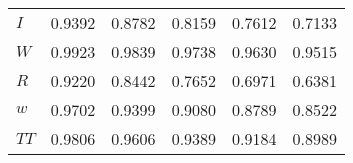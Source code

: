 \begin{center}
\begin{longtable}{lccccc}
$I         $	 & 	    0.9392	 & 	    0.8782	 & 	    0.8159	 & 	    0.7612	 & 	    0.7133 \\ 
$W         $	 & 	    0.9923	 & 	    0.9839	 & 	    0.9738	 & 	    0.9630	 & 	    0.9515 \\ 
$R         $	 & 	    0.9220	 & 	    0.8442	 & 	    0.7652	 & 	    0.6971	 & 	    0.6381 \\ 
$w         $	 & 	    0.9702	 & 	    0.9399	 & 	    0.9080	 & 	    0.8789	 & 	    0.8522 \\ 
$TT        $	 & 	    0.9806	 & 	    0.9606	 & 	    0.9389	 & 	    0.9184	 & 	    0.8989 \\ 
\end{longtable}
 \end{center}

